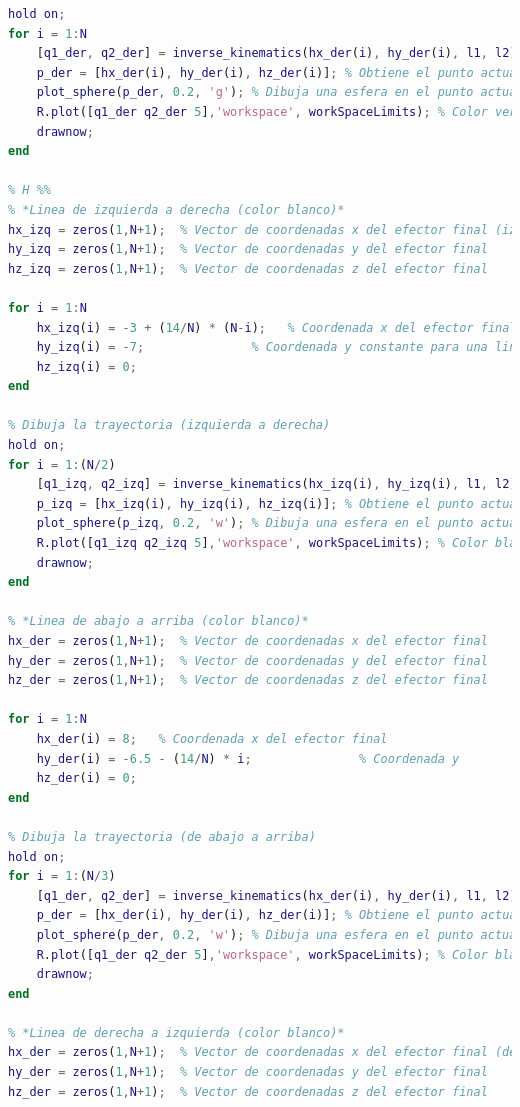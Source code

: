 \documentclass[final]{foresj}
\begin{document}
\begin{lstlisting}[language=Matlab]
% Dibuja la trayectoria (de abajo a arriba)
hold on;
for i = 1:N
    [q1_der, q2_der] = inverse_kinematics(hx_der(i), hy_der(i), l1, l2); 
    p_der = [hx_der(i), hy_der(i), hz_der(i)]; % Obtiene el punto actual de la trayectoria
    plot_sphere(p_der, 0.2, 'g'); % Dibuja una esfera en el punto actual para visualizar la trayectoria (color verde)
    R.plot([q1_der q2_der 5],'workspace', workSpaceLimits); % Color verde
    drawnow;
end

% H %%
% *Linea de izquierda a derecha (color blanco)*
hx_izq = zeros(1,N+1);  % Vector de coordenadas x del efector final (izquierda a derecha)
hy_izq = zeros(1,N+1);  % Vector de coordenadas y del efector final
hz_izq = zeros(1,N+1);  % Vector de coordenadas z del efector final

for i = 1:N
    hx_izq(i) = -3 + (14/N) * (N-i);   % Coordenada x del efector final (izquierda a derecha)
    hy_izq(i) = -7;               % Coordenada y constante para una linea recta
    hz_izq(i) = 0;
end

% Dibuja la trayectoria (izquierda a derecha)
hold on;
for i = 1:(N/2)
    [q1_izq, q2_izq] = inverse_kinematics(hx_izq(i), hy_izq(i), l1, l2); 
    p_izq = [hx_izq(i), hy_izq(i), hz_izq(i)]; % Obtiene el punto actual de la trayectoria
    plot_sphere(p_izq, 0.2, 'w'); % Dibuja una esfera en el punto actual para visualizar la trayectoria (color blanco)
    R.plot([q1_izq q2_izq 5],'workspace', workSpaceLimits); % Color blanco
    drawnow;
end

% *Linea de abajo a arriba (color blanco)*
hx_der = zeros(1,N+1);  % Vector de coordenadas x del efector final
hy_der = zeros(1,N+1);  % Vector de coordenadas y del efector final
hz_der = zeros(1,N+1);  % Vector de coordenadas z del efector final

for i = 1:N
    hx_der(i) = 8;   % Coordenada x del efector final
    hy_der(i) = -6.5 - (14/N) * i;               % Coordenada y
    hz_der(i) = 0;
end

% Dibuja la trayectoria (de abajo a arriba)
hold on;
for i = 1:(N/3)
    [q1_der, q2_der] = inverse_kinematics(hx_der(i), hy_der(i), l1, l2); 
    p_der = [hx_der(i), hy_der(i), hz_der(i)]; % Obtiene el punto actual de la trayectoria
    plot_sphere(p_der, 0.2, 'w'); % Dibuja una esfera en el punto actual para visualizar la trayectoria (color blanco)
    R.plot([q1_der q2_der 5],'workspace', workSpaceLimits); % Color blanco
    drawnow;
end

% *Linea de derecha a izquierda (color blanco)*
hx_der = zeros(1,N+1);  % Vector de coordenadas x del efector final (derecha a izquierda)
hy_der = zeros(1,N+1);  % Vector de coordenadas y del efector final
hz_der = zeros(1,N+1);  % Vector de coordenadas z del efector final


\end{lstlisting}
\end{document}
